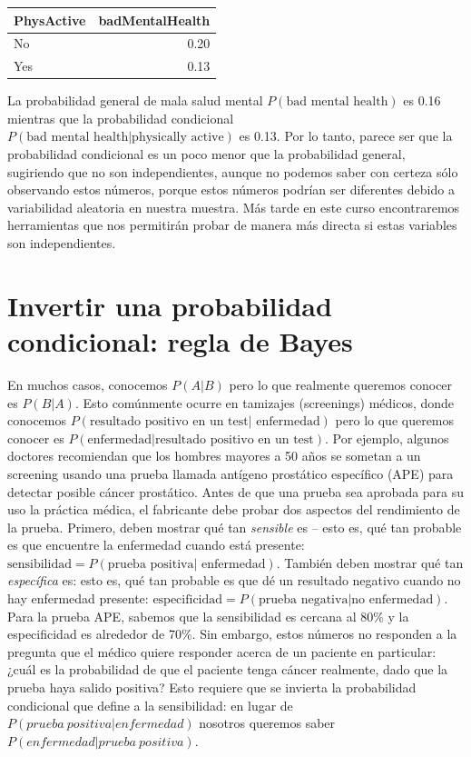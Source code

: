 \documentclass[
  12pt,
]{book}
\theoremstyle{definition}
\theoremstyle{definition}
\theoremstyle{definition}
\theoremstyle{remark}
\begin{document}
\begin{tabular}{l|r}
\hline
PhysActive & badMentalHealth\\
\hline
No & 0.20\\
\hline
Yes & 0.13\\
\hline
\end{tabular}

La probabilidad general de mala salud mental \(P(\text{bad mental health})\) es 0.16 mientras que la probabilidad condicional \(P(\text{bad mental health|physically active})\) es 0.13. Por lo tanto, parece ser que la probabilidad condicional es un poco menor que la probabilidad general, sugiriendo que no son independientes, aunque no podemos saber con certeza sólo observando estos números, porque estos números podrían ser diferentes debido a variabilidad aleatoria en nuestra muestra. Más tarde en este curso encontraremos herramientas que nos permitirán probar de manera más directa si estas variables son independientes.

\hypertarget{bayestheorem}{%
\section{Invertir una probabilidad condicional: regla de Bayes}\label{bayestheorem}}

En muchos casos, conocemos \(P(A|B)\) pero lo que realmente queremos conocer es \(P(B|A)\). Esto comúnmente ocurre en tamizajes (screenings) médicos, donde conocemos \(P(\text{resultado positivo en un test| enfermedad})\) pero lo que queremos conocer es \(P(\text{enfermedad|resultado positivo en un test})\). Por ejemplo, algunos doctores recomiendan que los hombres mayores a 50 años se sometan a un screening usando una prueba llamada antígeno prostático específico (APE) para detectar posible cáncer prostático. Antes de que una prueba sea aprobada para su uso la práctica médica, el fabricante debe probar dos aspectos del rendimiento de la prueba. Primero, deben mostrar qué tan \emph{sensible} es -- esto es, qué tan probable es que encuentre la enfermedad cuando está presente: \(\text{sensibilidad} = P(\text{prueba positiva| enfermedad})\). También deben mostrar qué tan \emph{específica} es: esto es, qué tan probable es que dé un resultado negativo cuando no hay enfermedad presente: \(\text{especificidad} = P(\text{prueba negativa|no enfermedad})\). Para la prueba APE, sabemos que la sensibilidad es cercana al 80\% y la especificidad es alrededor de 70\%. Sin embargo, estos números no responden a la pregunta que el médico quiere responder acerca de un paciente en particular: ¿cuál es la probabilidad de que el paciente tenga cáncer realmente, dado que la prueba haya salido positiva? Esto requiere que se invierta la probabilidad condicional que define a la sensibilidad: en lugar de \(P(prueba\ positiva| enfermedad)\) nosotros queremos saber \(P(enfermedad|prueba\ positiva)\).
\end{document}
